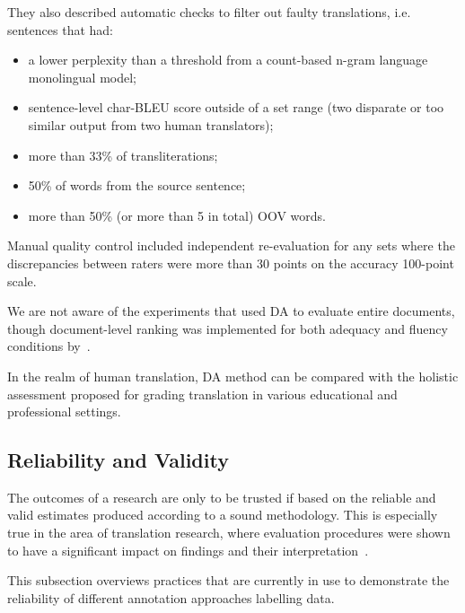 They also described automatic checks to filter out faulty translations, i.e. sentences that had:
\begin{itemize}\compresslist{}
	\item a lower perplexity than a threshold from a count-based n-gram language monolingual model;
	\item sentence-level char-BLEU score outside of a set range (two disparate or too similar output from two human translators);
	\item more than 33\% of transliterations;
	\item 50\% of words from the source sentence;
	\item more than 50\% (or more than 5 in total) \gls{OOV} words.
\end{itemize}

Manual quality control included independent re-evaluation for any sets where the discrepancies between raters were more than 30 points on the accuracy 100-point scale.

We are not aware of the experiments that used DA to evaluate entire documents, though document-level ranking was implemented for both adequacy and fluency conditions by~\citet{Laubli2018}. 

In the realm of human translation, DA method can be compared with the holistic assessment proposed for grading translation in various educational and professional settings.


\subsection{\label{ssec:relval}Reliability and Validity}
The outcomes of a research are only to be trusted if based on the reliable and valid estimates produced according to a sound methodology. This is especially true in the area of translation research, where evaluation procedures were shown to have a significant impact on findings and their interpretation~\cite{Laubli2020}.

This subsection overviews practices that are currently in use to demonstrate the reliability of different annotation approaches labelling data. 

